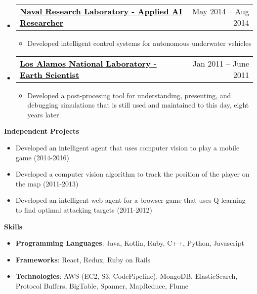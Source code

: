 \documentclass[letterpaper,12pt]{article}
\makeatletter
\newcommand{\link}[2]{\href{#1}{\textcolor{black}{#2}}}
\newcommand{\resitem}[1]{\item #1 \vspace{-2pt}}
\newcommand{\resheading}[1]{{\large \colorbox{mygrey}{\begin{minipage}{\textwidth}{\textbf{\sc #1 \vphantom{p\^{E}}}}\end{minipage}}}}
\newcommand{\miniheading}[2]{
	\begin{tabular*}{6.5in}{l@{\extracolsep{\fill}}r}
			\textbf{#1} & #2 \\
	\end{tabular*}\vspace{-6pt}
}
\makeatother
\begin{document}
\begin{itemize}
        \item \miniheading
            {\link{http://www.nrl.navy.mil/}{Naval Research Laboratory - Applied AI Researcher}}
            {May 2014 -- Aug 2014}
				\begin{itemize}
                    \resitem{Developed intelligent control systems for autonomous underwater vehicles}
               \end{itemize}
		\item \miniheading
            {\link{http://www.lanl.gov}{Los Alamos National Laboratory - Earth Scientist}}
            {Jan 2011 -- June 2011}
				\begin{itemize}
					\resitem{Developed a post-procesing tool for understanding, presenting, and debugging simulations that is still used and maintained to this day, eight years later.}
				\end{itemize}
	\end{itemize}
	
	
	\resheading{Independent Projects}
    \begin{itemize}
		\resitem{Developed an intelligent agent that uses computer vision to play a mobile game (2014-2016)}
		\resitem{Developed a computer vision algorithm to track the position of the player on the map (2011-2013)}
		\resitem{Developed an intelligent web agent for a browser game that uses Q-learning to find optimal attacking targets (2011-2012)}
    \end{itemize}

\resheading{Skills}
	\begin{itemize}
		\resitem{\textbf{Programming Languages}: Java, Kotlin, Ruby, C++, Python, Javascript}
		\resitem{\textbf{Frameworks}: React, Redux, Ruby on Rails}
        \resitem{\textbf{Technologies}: AWS (EC2, S3, CodePipeline), MongoDB, ElasticSearch, Protocol Buffers, BigTable, Spanner, MapReduce, Flume}
	\end{itemize} %
\end{document}
